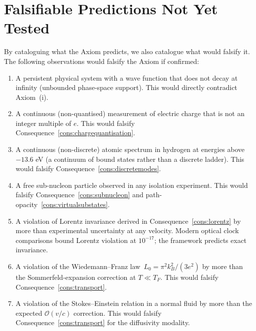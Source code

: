 \section*{Falsifiable Predictions Not Yet Tested}

By cataloguing what the Axiom predicts, we also catalogue what would falsify
it.  The following observations would falsify the Axiom if confirmed:

\begin{enumerate}[leftmargin=2em]
  \item A persistent physical system with a wave function that does not decay
    at infinity (unbounded phase-space support).  This would directly
    contradict Axiom~(i).

  \item A continuous (non-quantised) measurement of electric charge that is
    not an integer multiple of $e$.  This would falsify
    Consequence~\ref{cons:chargequantisation}.

  \item A continuous (non-discrete) atomic spectrum in hydrogen at energies
    above $-13.6$ eV (a continuum of bound states rather than a discrete
    ladder).  This would falsify Consequence~\ref{cons:discretemodes}.

  \item A free sub-nucleon particle observed in any isolation experiment.
    This would falsify Consequence~\ref{cons:subnucleon} and
    path-opacity~\ref{cons:virtualsubstates}.

  \item A violation of Lorentz invariance derived in
    Consequence~\ref{cons:lorentz} by more than experimental uncertainty at
    any velocity.  Modern optical clock comparisons bound Lorentz violation
    at $10^{-17}$; the framework predicts exact invariance.

  \item A violation of the Wiedemann--Franz law~$L_{0}=\pi^{2}k_B^{2}/(3e^{2})$
    by more than the Sommerfeld-expansion correction at $T\ll T_F$.  This
    would falsify Consequence~\ref{cons:transport}.

  \item A violation of the Stokes--Einstein relation in a normal fluid by
    more than the expected $\mathcal{O}(v/c)$ correction.  This would
    falsify Consequence~\ref{cons:transport} for the diffusivity modality.


\end{enumerate}
